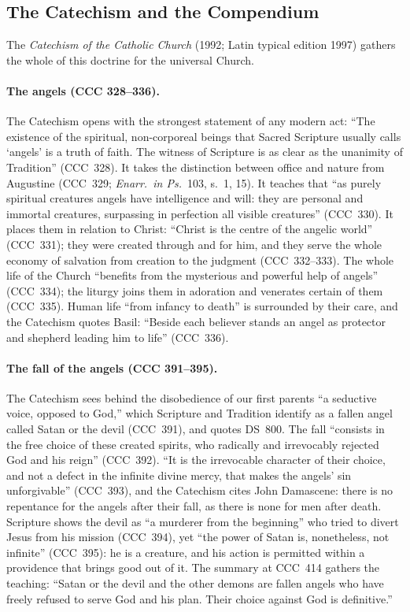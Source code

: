 \sectionguard
\subsection{The Catechism and the Compendium}

The \emph{Catechism of the Catholic Church} (1992; Latin typical edition
1997) gathers the whole of this doctrine for the universal Church.

\paragraph{The angels (CCC 328--336).} The Catechism opens with the
strongest statement of any modern act: ``The existence of the spiritual,
non-corporeal beings that Sacred Scripture usually calls `angels' is a
truth of faith. The witness of Scripture is as clear as the unanimity of
Tradition'' (CCC~328). It takes the distinction between office and nature
from Augustine (CCC~329; \emph{Enarr.\ in Ps.}\ 103, s.~1, 15). It teaches
that ``as purely spiritual creatures angels have intelligence and will:
they are personal and immortal creatures, surpassing in perfection all
visible creatures'' (CCC~330). It places them in relation to Christ:
``Christ is the centre of the angelic world'' (CCC~331); they were created
through and for him, and they serve the whole economy of salvation from
creation to the judgment (CCC~332--333). The whole life of the Church
``benefits from the mysterious and powerful help of angels'' (CCC~334); the
liturgy joins them in adoration and venerates certain of them (CCC~335).
Human life ``from infancy to death'' is surrounded by their care, and the
Catechism quotes Basil: ``Beside each believer stands an angel as protector
and shepherd leading him to life'' (CCC~336).

\paragraph{The fall of the angels (CCC 391--395).} The Catechism sees behind
the disobedience of our first parents ``a seductive voice, opposed to
God,'' which Scripture and Tradition identify as a fallen angel called Satan
or the devil (CCC~391), and quotes DS~800. The fall ``consists in the free
choice of these created spirits, who radically and irrevocably rejected God
and his reign'' (CCC~392). ``It is the irrevocable character of their
choice, and not a defect in the infinite divine mercy, that makes the
angels' sin unforgivable'' (CCC~393), and the Catechism cites John
Damascene: there is no repentance for the angels after their fall, as there
is none for men after death. Scripture shows the devil as ``a murderer from
the beginning'' who tried to divert Jesus from his mission (CCC~394), yet
``the power of Satan is, nonetheless, not infinite'' (CCC~395): he is a
creature, and his action is permitted within a providence that brings good
out of it. The summary at CCC~414 gathers the teaching: ``Satan or the devil
and the other demons are fallen angels who have freely refused to serve God
and his plan. Their choice against God is definitive.''


